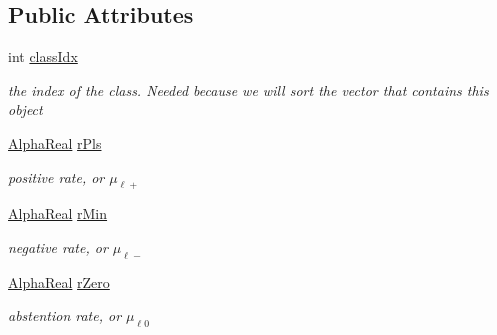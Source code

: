 \subsection*{Public Attributes}
\begin{DoxyCompactItemize}
\item 
\hypertarget{structMultiBoost_1_1sRates_a609c592f22f0aab484558632eaaaa44a}{int \hyperlink{structMultiBoost_1_1sRates_a609c592f22f0aab484558632eaaaa44a}{class\-Idx}}\label{structMultiBoost_1_1sRates_a609c592f22f0aab484558632eaaaa44a}

\begin{DoxyCompactList}\small\item\em the index of the class. Needed because we will sort the vector that contains this object \end{DoxyCompactList}\item 
\hypertarget{structMultiBoost_1_1sRates_ad1decfaf0bf6e2ec669134c743f58966}{\hyperlink{Defaults_8h_a80184c4fd10ab70a1a17c5f97dcd1563}{Alpha\-Real} \hyperlink{structMultiBoost_1_1sRates_ad1decfaf0bf6e2ec669134c743f58966}{r\-Pls}}\label{structMultiBoost_1_1sRates_ad1decfaf0bf6e2ec669134c743f58966}

\begin{DoxyCompactList}\small\item\em positive rate, or $\mu_{\ell+}$ \end{DoxyCompactList}\item 
\hypertarget{structMultiBoost_1_1sRates_a247fadf30b053ffdccf5c0be9affaa61}{\hyperlink{Defaults_8h_a80184c4fd10ab70a1a17c5f97dcd1563}{Alpha\-Real} \hyperlink{structMultiBoost_1_1sRates_a247fadf30b053ffdccf5c0be9affaa61}{r\-Min}}\label{structMultiBoost_1_1sRates_a247fadf30b053ffdccf5c0be9affaa61}

\begin{DoxyCompactList}\small\item\em negative rate, or $\mu_{\ell-}$ \end{DoxyCompactList}\item 
\hypertarget{structMultiBoost_1_1sRates_ad846dd33ebe2152f8e991d840671b113}{\hyperlink{Defaults_8h_a80184c4fd10ab70a1a17c5f97dcd1563}{Alpha\-Real} \hyperlink{structMultiBoost_1_1sRates_ad846dd33ebe2152f8e991d840671b113}{r\-Zero}}\label{structMultiBoost_1_1sRates_ad846dd33ebe2152f8e991d840671b113}

\begin{DoxyCompactList}\small\item\em abstention rate, or $\mu_{\ell0}$ \end{DoxyCompactList}\end{DoxyCompactItemize}


